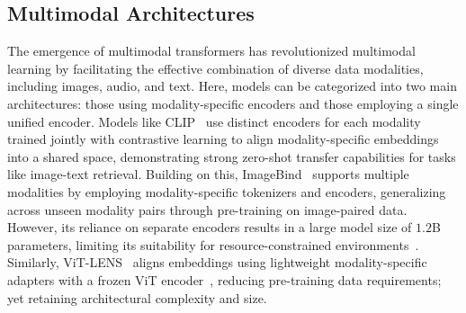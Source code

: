 
\subsection{Multimodal Architectures}
The emergence of multimodal transformers has revolutionized multimodal learning by facilitating the effective combination of diverse data modalities, including images, audio, and text. Here, models can be categorized into two main architectures: those using modality-specific encoders and those employing a single unified encoder. Models like CLIP~\cite{clip} use distinct encoders for each modality trained jointly with contrastive learning to align modality-specific embeddings into a shared space, demonstrating strong zero-shot transfer capabilities for tasks like image-text retrieval. Building on this, ImageBind~\cite{imagebind} supports multiple modalities by employing modality-specific tokenizers and encoders, generalizing across unseen modality pairs through pre-training on image-paired data. However, its reliance on separate encoders results in a large model size of $1.2$B parameters, limiting its suitability for resource-constrained environments~\cite{imagebind}. Similarly, ViT-LENS~\cite{ViT-LENS} aligns embeddings using lightweight modality-specific adapters with a frozen ViT encoder~\cite{ViT}, reducing pre-training data requirements; yet retaining architectural complexity and size.

